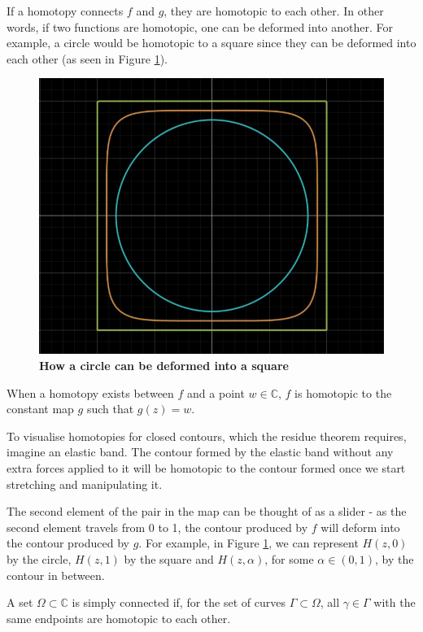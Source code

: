 \documentclass[a4paper]{article}
\begin{document}
If a homotopy connects $f$ and $g$, they are homotopic to each other. In other words, if two functions are homotopic, one can be deformed into another. For example, a circle would be homotopic to a square since they can be deformed into each other (as seen in Figure \ref{fig:circtosquare}). 
\begin{figure}[h!]
\begin{center}
\includegraphics[scale=0.20]{c2shomotopy}
\end{center}
\caption{\textbf{How a circle can be deformed into a square}}
\label{fig:circtosquare}
\end{figure}

When a homotopy exists between $f$ and a point $w \in \mathbb{C}$, $f$ is homotopic to the constant map $g$ such that $g(z) = w$.

To visualise homotopies for closed contours, which the residue theorem requires, imagine an elastic band. The contour formed by the elastic band without any extra forces applied to it will be homotopic to the contour formed once we start stretching and manipulating it. 

The second element of the pair in the map can be thought of as a slider - as the second element travels from 0 to 1, the contour produced by $f$ will deform into the contour produced by $g$. For example, in Figure \ref{fig:circtosquare}, we can represent $H(z,0)$ by the circle, $H(z,1)$ by the square and $H(z,\alpha)$, for some $\alpha \in (0,1)$, by the contour in between.

\begin{definition}{\citep[p.22]{Roe}}{}
A set $\Omega \subset \mathbb{C}$ is simply connected if, for the set of curves $\Gamma \subset \Omega$, all $\gamma \in \Gamma$ with the same endpoints are homotopic to each other. 
\end{definition}
\end{document}
